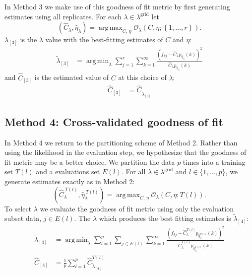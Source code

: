 \documentclass[12pt]{article}
\DeclareMathOperator*{\argmin}{arg\,min}
\DeclareMathOperator*{\argmax}{arg\,max}
\newcommand{\lambdagrid}{\lambda^{\text{grid}}}
\theoremstyle{break}
\theoremstyle{break}
\begin{document}
In Method 3 we make use of this goodness of fit metric by first generating estimates using all replicates.  For each $\lambda \in \lambdagrid$ let
\begin{equation}
\left(\widehat{C}_{\lambda}, \widehat{\eta}_{\lambda} \right) = \argmax_{C, \, \eta} \mathcal{O}_\lambda \left(C, \eta; \left\{1, \dots, r \right\} \right). \label{eq:c_hat_lambdas_method_3}
\end{equation}
$\widetilde{\lambda}_{[3]}$ is the $\lambda$ value with the best-fitting estimates of $C$ and $\eta$:
\begin{align}
\widetilde{\lambda}_{[3]} &= \argmin_{\lambda} \sum_{j=1}^r \sum_{k=1}^{\infty} \frac{ \left( f_{kj} - \widehat{C}_{\lambda} p_{\widehat{\eta}_{\lambda}}(k) \right)^2}{\widehat{C}_{\lambda}p_{\widehat{\eta}_{\lambda}}(k)} \label{eq:selected_lambda_3}
\end{align}
and $\widehat{C}_{[3]}$ is the estimated value of $C$ at this choice of $\lambda$:
\begin{align}
\widehat{C}_{[3]} &= \widehat{C}_{\widetilde{\lambda}_{[3]}}
\end{align}

%
%
%
\subsection{Method 4: Cross-validated goodness of fit}

In Method 4 we return to the partitioning scheme of Method 2.  Rather than using the likelihood in the evaluation step, we hypothesize that the goodness of fit metric may be a better choice.
We partition the data $p$ times into a training set $T(l)$ and a evaluations set $E(l)$.
For all $\lambda \in \lambdagrid$ and $l \in \{1, \dots , p \}$, we generate estimates exactly as in Method 2:
\begin{equation}
\left(\widehat{C}_{\lambda}^{ \ T(l)}, \widehat{\eta}_{\lambda}^{ \ T(l)} \right) = \argmax_{C, \, \eta} \mathcal{O}_\lambda \left(C, \eta; T(l) \right). \label{eq:c_hat_lambda_method_4}
\end{equation}
To select $\lambda$ we evaluate the goodness of fit metric using only the evaluation subset data, $j \in E(l)$.  The $\lambda$ which produces the best fitting estimates is $\widetilde{\lambda}_{[4]}$:
\begin{align}
\widetilde{\lambda}_{[4]} &= \argmin_{\lambda} \sum_{l = 1}^p \sum_{j \in E(l)} \sum_{k=1}^{\infty} \frac{ \left( f_{kj} - \widehat{C}_{\lambda}^{T(l)} p_{\widehat{\eta}_{\lambda}^{T(l)}}(k) \right)^2}{\widehat{C}_{\lambda}^{T(l)}p_{\widehat{\eta}_{\lambda}^{T(l)}}(k)} \\
\widehat{C}_{[4]} &= \frac{1}{p} \sum_{l=1}^p \widehat{C}_{\widetilde{\lambda}_{[4]}}^{T(l)}
\end{align}
\end{document}
